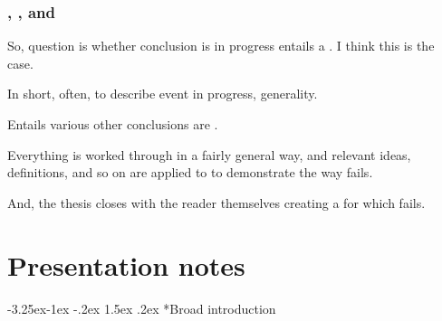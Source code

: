 \documentclass[10pt]{article}
\makeatletter
\renewcommand\paragraph{\@startsection{paragraph}{4}{\z@}%
  {-3.25ex\@plus -1ex \@minus -.2ex}%
  {1.5ex \@plus .2ex}%
  {\normalfont\normalsize\bfseries}}
\makeatother
\begin{document}
\subsubsection{, , and }
\label{sec:progex-fingfr1}

\begin{note}
  So, question is whether \eiw{} conclusion is in progress entails a \fingfr{}.
  I think this is the case.

  In short, often, to describe event in progress, generality.

  Entails various other conclusions are .
\end{note}

\begin{note}
  Everything is worked through in a fairly general way, and relevant ideas, definitions, and so on are applied to  to demonstrate the way \issueInclusion{} fails.

  And, the thesis closes with the reader themselves creating a  for which \issueInclusion{} fails.
\end{note}

\newpage

\section*{Presentation notes}
\label{sec:presentation-notes}

\paragraph*{Broad introduction}
\end{document}

